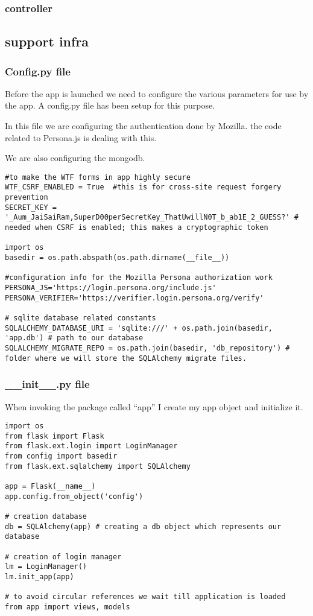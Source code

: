 \documentclass[11pt]{article}
\begin{document}
\subsubsection{controller}
\label{sec-4-2-4}
\subsection{support infra}
\label{sec-4-3}
\subsubsection{Config.py file}
\label{sec-4-3-1}

Before the app is launched we need to configure the various parameters
for use by the app. A config.py file has been setup for this purpose.

In this file we are configuring the authentication done by
Mozilla. the code related to Persona.js is dealing with this.

We are also configuring the mongodb.


\begin{verbatim}
#to make the WTF forms in app highly secure 
WTF_CSRF_ENABLED = True  #this is for cross-site request forgery prevention
SECRET_KEY = '_Aum_JaiSaiRam,SuperD00perSecretKey_ThatUwillN0T_b_ab1E_2_GUESS?' # needed when CSRF is enabled; this makes a cryptographic token

import os
basedir = os.path.abspath(os.path.dirname(__file__))

#configuration info for the Mozilla Persona authorization work
PERSONA_JS='https://login.persona.org/include.js'
PERSONA_VERIFIER='https://verifier.login.persona.org/verify'

# sqlite database related constants
SQLALCHEMY_DATABASE_URI = 'sqlite:///' + os.path.join(basedir, 'app.db') # path to our database
SQLALCHEMY_MIGRATE_REPO = os.path.join(basedir, 'db_repository') # folder where we will store the SQLAlchemy migrate files.
\end{verbatim}
\subsubsection{__init__.py file}
\label{sec-4-3-2}

When invoking the package called ``app'' I create my app object and
initialize it.


\begin{verbatim}
import os
from flask import Flask
from flask.ext.login import LoginManager
from config import basedir
from flask.ext.sqlalchemy import SQLAlchemy

app = Flask(__name__)
app.config.from_object('config')

# creation database 
db = SQLAlchemy(app) # creating a db object which represents our database

# creation of login manager
lm = LoginManager()
lm.init_app(app)

# to avoid circular references we wait till application is loaded
from app import views, models
\end{verbatim}
\end{document}
